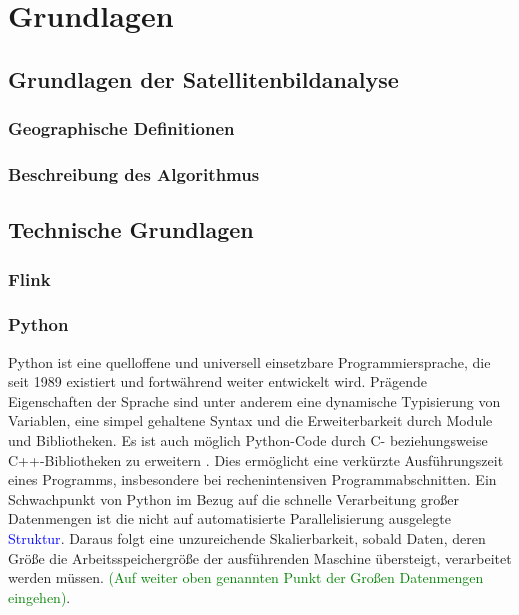 \chapter{Grundlagen}
\section{Grundlagen der Satellitenbildanalyse}
\subsection{Geographische Definitionen}
\subsection{Beschreibung des Algorithmus}

\section{Technische Grundlagen}
\subsection{Flink}
\subsection{Python}
Python ist eine quelloffene und universell einsetzbare Programmiersprache, die seit 1989 existiert und fortwährend weiter entwickelt wird. Prägende Eigenschaften der Sprache sind unter anderem eine dynamische Typisierung von Variablen, eine simpel gehaltene Syntax und die Erweiterbarkeit durch Module und Bibliotheken. Es ist auch möglich Python-Code durch C- beziehungsweise C++-Bibliotheken zu erweitern \cite{Martelli2006}. Dies ermöglicht eine verkürzte Ausführungszeit eines Programms, insbesondere bei rechenintensiven Programmabschnitten. Ein Schwachpunkt von Python im Bezug auf die schnelle Verarbeitung großer Datenmengen ist die nicht auf automatisierte Parallelisierung ausgelegte \textcolor{blue}{Struktur}. Daraus folgt eine unzureichende Skalierbarkeit, sobald Daten, deren Größe die Arbeitsspeichergröße der ausführenden Maschine übersteigt, verarbeitet werden müssen. \textcolor{green}{(Auf weiter oben genannten Punkt der Großen Datenmengen eingehen)}. 

